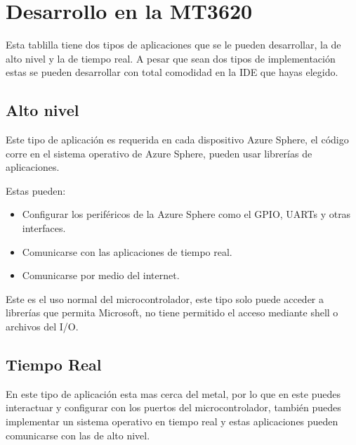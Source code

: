 \section{Desarrollo en la MT3620}
Esta tablilla tiene dos tipos de aplicaciones que se le pueden desarrollar, la de alto nivel y la de tiempo real. A pesar que sean dos tipos de implementación estas se pueden desarrollar con total comodidad en la IDE que hayas elegido.


\subsection{Alto nivel}
Este tipo de aplicación es requerida en cada dispositivo Azure Sphere, el código corre en el sistema operativo de Azure Sphere, pueden usar librerías de aplicaciones.

Estas pueden:
\begin{itemize}
	\item
	Configurar los periféricos de la Azure Sphere como el GPIO, UARTs y otras interfaces.
	\item 
	Comunicarse con las aplicaciones de tiempo real.
	\item 
	Comunicarse por medio del internet.
\end{itemize}

Este es el uso normal del microcontrolador, este tipo solo puede acceder a librerías que permita Microsoft, no tiene permitido el acceso mediante shell o archivos del I/O.

\subsection{Tiempo Real}
En este tipo de aplicación esta mas cerca del metal, por lo que en este puedes interactuar y configurar con los puertos del microcontrolador, también puedes implementar un sistema operativo en tiempo real y estas aplicaciones pueden comunicarse con las de alto nivel.


